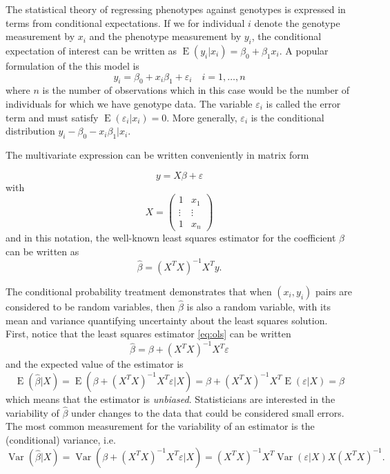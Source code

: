 \documentclass[review]{siamart0516}
\DeclareMathOperator{\E}{E}
\DeclareMathOperator{\Var}{Var}
\begin{document}
The statistical theory of regressing phenotypes against genotypes is expressed
in terms from conditional expectations. If we for individual $i$ denote the genotype measurement by $x_i$ and the phenotype measurement by $y_i$, the conditional
expectation of interest can be written as $\E(y_i|x_i)=\beta_0 + \beta_1 x_i$.
A popular formulation of the this model is
%
\begin{equation*}
    y_i = \beta_0 + x_i \beta_1 + \varepsilon_i\quad i=1,\dots,n
\end{equation*}
%
where $n$ is the number of observations which in this case would be the number of individuals for which we have genotype data.
The variable $\varepsilon_i$ is called the error term and must satisfy $\E(\varepsilon_i|x_i)=0$.
More generally, $\varepsilon_i$ is the conditional distribution $y_i - \beta_0 - x_i\beta_1|x_i$.

The multivariate expression can be written conveniently in matrix form

\begin{equation}
\label{eq:linreg}
    y = X\beta + \varepsilon
\end{equation}
%
with
%
\begin{equation*}
    X = \begin{pmatrix}
        1 & x_1\\
        \vdots & \vdots \\
        1 & x_n
    \end{pmatrix}
\end{equation*}
%
and in this notation, the well-known least squares estimator for the coefficient
$\beta$ can be written as
%
\begin{equation}
\label{eq:ols}
    \hat{\beta} = (X^TX)^{-1}X^Ty.
\end{equation}

The conditional probability treatment demonstrates that when $(x_i,y_i)$ pairs
are considered to be random variables, then $\hat{\beta}$ is also a random
variable, with its mean and variance quantifying uncertainty about the least
squares solution.
First, notice that the least squares estimator \eqref{eq:ols} can be written
%
\begin{equation*}
    \hat{\beta} = \beta + (X^TX)^{-1}X^T\varepsilon
\end{equation*}
%
and the expected value of the estimator is
%
\begin{equation}
    \E(\hat{\beta}|X) = \E(\beta + (X^TX)^{-1}X^T\varepsilon|X) =
        \beta + (X^TX)^{-1}X^T\E(\varepsilon|X) = \beta
\end{equation}
%
which means that the estimator is \emph{unbiased}. Statisticians are interested in the variability of $\hat{\beta}$ under changes to the data that could be considered small errors. The most common measurement for the variability of an estimator is the (conditional) variance, i.e.
%
\begin{equation*}
    \Var(\hat{\beta}|X) = \Var(\beta + (X^TX)^{-1}X^T\varepsilon|X) =
        (X^TX)^{-1}X^T\Var(\varepsilon|X)X(X^TX)^{-1}.
\end{equation*}
\end{document}
